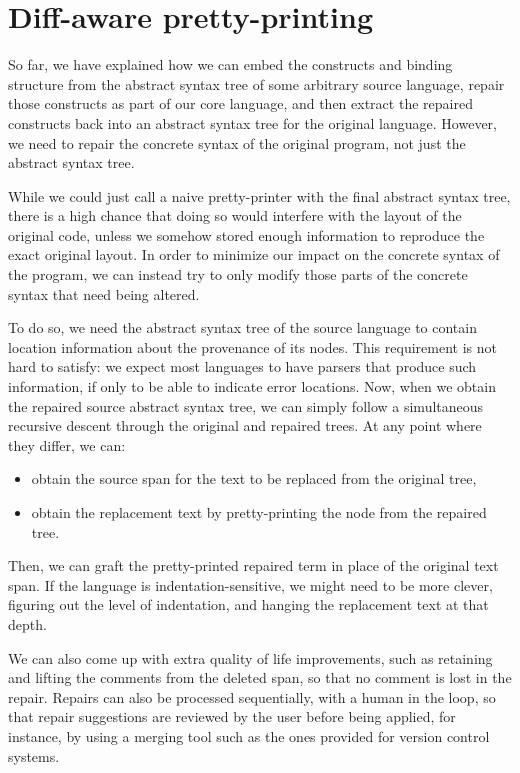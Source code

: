 \section{Diff-aware pretty-printing}\label{coop-diff-pretty-printer}

So far, we have explained how we can embed the constructs and binding structure
from the abstract syntax tree of some arbitrary source language, repair those
constructs as part of our core language, and then extract the repaired
constructs back into an abstract syntax tree for the original language.
However, we need to repair the concrete syntax of the original program, not just
the abstract syntax tree.

While we could just call a naive pretty-printer with the final abstract syntax
tree, there is a high chance that doing so would interfere with the layout of
the original code, unless we somehow stored enough information to reproduce the
exact original layout.  In order to minimize our impact on the concrete syntax
of the program, we can instead try to only modify those parts of the concrete
syntax that need being altered.

To do so, we need the abstract syntax tree of the source language to contain
location information about the provenance of its nodes.  This requirement is not
hard to satisfy: we expect most languages to have parsers that produce such
information, if only to be able to indicate error locations.  Now, when we
obtain the repaired source abstract syntax tree, we can simply follow a
simultaneous recursive descent through the original and repaired trees.  At any
point where they differ, we can:

\begin{itemize}

  \item obtain the source span for the text to be replaced from the original
tree,

  \item obtain the replacement text by pretty-printing the node from the
repaired tree.

\end{itemize}

\noindent
Then, we can graft the pretty-printed repaired term in place of the original
text span.  If the language is indentation-sensitive, we might need to be more
clever, figuring out the level of indentation, and hanging the replacement
text at that depth.

We can also come up with extra quality of life improvements, such as retaining
and lifting the comments from the deleted span, so that no comment is lost in
the repair.  Repairs can also be processed sequentially, with a human in the
loop, so that repair suggestions are reviewed by the user before being applied,
for instance, by using a merging tool such as the ones provided for version
control systems.
